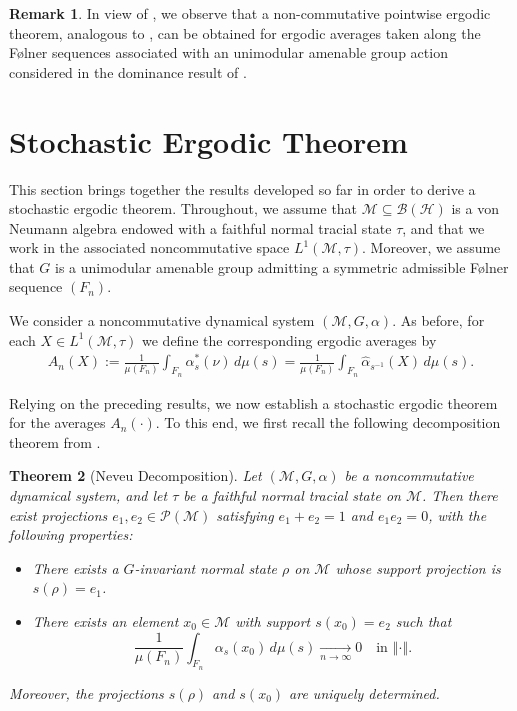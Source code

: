 \documentclass[11pt]{amsart}
\newtheorem{thm}{Theorem}[section]
\theoremstyle{definition}
\theoremstyle{myremark}
\newtheorem{rem}[thm]{Remark}
\numberwithin{equation}{section}
\newcommand{\CM}{\mathcal{M}}
\newcommand{\CP}{\mathcal{P}}
\newcommand{\norm}[1]{\left\Vert#1\right\Vert}
\begin{document}
\begin{rem}
   In view of , we observe that a non-commutative pointwise ergodic theorem, analogous to \cite[Theorem~4.17]{Bik-Dip-neveu}, can be obtained for ergodic averages taken along the F\o lner sequences associated with an unimodular amenable group action considered in the dominance result of \cite[Theorem~3.1]{chakraborty2025ergodic}.




    
\end{rem}

\section{\textbf{Stochastic Ergodic Theorem}}

This section brings together the results developed so far in order to derive a stochastic ergodic theorem. Throughout, we  assume that $\mathcal{M} \subseteq \mathcal{B}(\mathcal{H})$ is a von Neumann algebra endowed with a faithful normal tracial state $\tau$, and that we work in the associated noncommutative space $L^1(\mathcal{M},\tau)$. Moreover, we assume that $G$ is a unimodular amenable group admitting a symmetric admissible Følner sequence $(F_n)$.

We consider a noncommutative dynamical system $(\mathcal{M}, G, \alpha)$. As before, for each $X \in L^1(\mathcal{M},\tau)$ we define the corresponding ergodic averages by
\begin{align*}
	A_n(X)
	:= \frac{1}{\mu(F_n)} \int_{F_n} \alpha_s^*(\nu)\, d\mu(s)
	= \frac{1}{\mu(F_n)} \int_{F_n} \hat{\alpha}_{s^{-1}}(X)\, d\mu(s).
\end{align*}

Relying on the preceding results, we now establish a stochastic ergodic theorem for the averages $A_n(\cdot)$. To this end, we first recall the following decomposition theorem from \cite{Bik-Dip-neveu}.

\begin{thm}[Neveu Decomposition]\label{neveu decomposition}
	Let $(\CM, G, \alpha)$ be a noncommutative dynamical system, and let $\tau$ be a faithful normal tracial state on $\CM$. Then there exist projections $e_1, e_2 \in \CP(\CM)$ satisfying $e_1 + e_2 = 1$ and $e_1 e_2 = 0$, with the following properties:
	\begin{itemize}
		\item[(i)] There exists a $G$-invariant normal state $\rho$ on $\CM$ whose support projection is $s(\rho) = e_1$.
		\item[(ii)] There exists an element $x_0 \in \CM$ with support $s(x_0) = e_2$ such that
		\[
			\frac{1}{\mu(F_n)} \int_{F_n} \alpha_s(x_0)\, d\mu(s)
			\xrightarrow[n \to \infty]{} 0
			\quad \text{in } \norm{\cdot}.
		\]
	\end{itemize}
	Moreover, the projections $s(\rho)$ and $s(x_0)$ are uniquely determined.
\end{thm}
\end{document}
